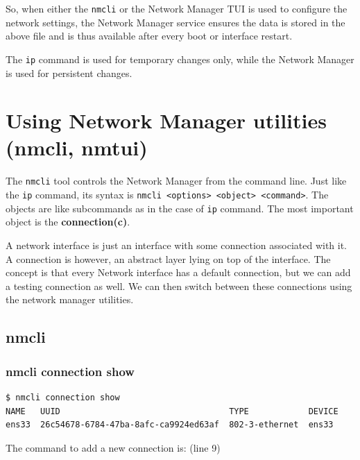 So, when either the \verb|nmcli| or the Network Manager TUI is used to configure the network settings, the Network Manager service ensures the data is stored in the above file and is thus available after every boot or interface restart. 

The \verb|ip| command is used for temporary changes only, while the Network Manager is used for persistent changes.

 	\section{Using Network Manager utilities (nmcli, nmtui)}
The \verb|nmcli| tool controls the Network Manager from the command line. Just like the \verb|ip| command, its syntax is \verb|nmcli <options> <object> <command>|. The objects are like subcommands as in the case of \verb|ip| command. The most important object is the \textbf{connection(c)}.

A network interface is just an interface with some connection associated with it. A connection is however, an abstract layer lying on top of the interface. The concept is that every Network interface has a default connection, but we can add a testing connection as well. We can then switch between these connections using the network manager utilities. 

\subsection{nmcli}
\vspace{-5pt}
\subsubsection{nmcli connection show}
\vspace{-15pt}
\begin{verbatim}
$ nmcli connection show
NAME   UUID                                  TYPE            DEVICE 
ens33  26c54678-6784-47ba-8afc-ca9924ed63af  802-3-ethernet  ens33
\end{verbatim}
\vspace{-10pt}

\noindent
The command to add a new connection is: (line 9)

